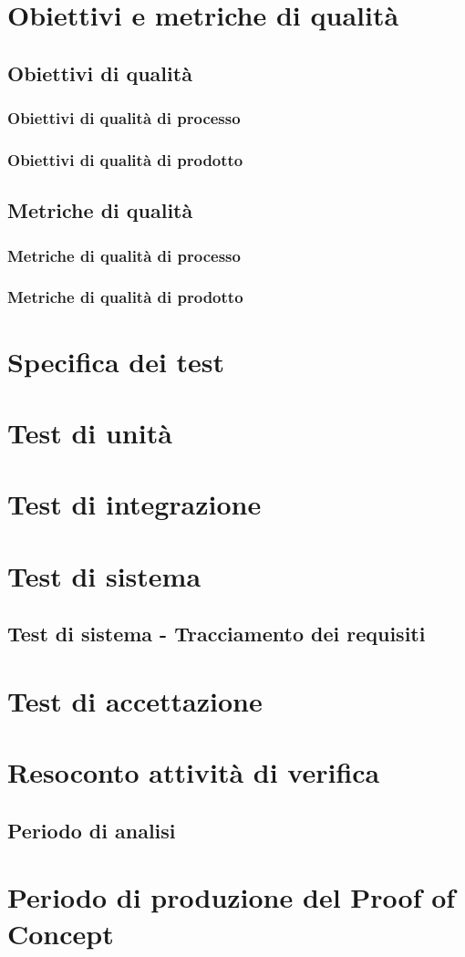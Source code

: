 \section{Obiettivi e metriche di qualità}
    \subsection{Obiettivi di qualità}
        \subsubsection{Obiettivi di qualità di processo}
        \subsubsection{Obiettivi di qualità di prodotto}
    \subsection{Metriche di qualità}
        \subsubsection{Metriche di qualità di processo}
        \subsubsection{Metriche di qualità di prodotto}
\section{Specifica dei test}
\section{Test di unità}
\section{Test di integrazione}
\section{Test di sistema}
    \subsection{Test di sistema - Tracciamento dei requisiti}
\section{Test di accettazione}
\section{Resoconto attività di verifica}
\subsection{Periodo di analisi}
\section{Periodo di produzione del Proof of Concept}
